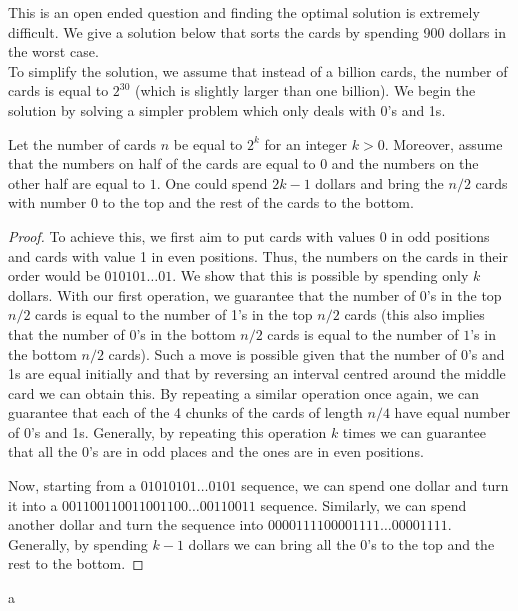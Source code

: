 \begin{solution}
This is an open ended question and finding the optimal solution is extremely difficult. We give a solution below that sorts the cards by spending 900 dollars in the worst case.\\[0.2cm]

To simplify the solution, we assume that instead of a billion cards, the number of cards is equal to $2^{30}$ (which is slightly larger than one billion). We begin the solution by solving a simpler problem which only deals with 0's and 1s.
\begin{lemma}\label{lemma:mohem}
	Let the number of cards $n$ be equal to $2^k$ for an integer $k > 0$. Moreover, assume that the numbers on half of the cards are equal to 0 and the numbers on the other half are equal to $1$. One could spend $2k-1$ dollars and bring the $n/2$ cards with number 0 to the top and the rest of the cards to the bottom.
\end{lemma}
\begin{proof}
To achieve this, we first aim to put cards with values 0 in odd positions and cards with value 1 in even positions. Thus, the numbers on the cards in their order would be $010101\ldots01$. We show that this is possible by spending only $k$ dollars. With our first operation, we guarantee that the number of 0's in the top $n/2$ cards is equal to the number of 1's in the top $n/2$ cards (this also implies that the number of 0's in the bottom $n/2$ cards is equal to the number of $1$'s in the bottom $n/2$ cards). Such a move is possible given that the number of 0's and 1s are equal initially and that by reversing an interval centred around the middle card we can obtain this. By repeating a similar operation once again, we can guarantee that each of the 4 chunks of the cards of length $n/4$ have equal number of 0's and 1s. Generally, by repeating this operation $k$ times we can guarantee that all the 0's are in odd places and the ones are in even positions.

Now, starting from a $01010101\ldots0101$ sequence, we can spend one dollar and turn it into a $001100110011001100\ldots00110011$ sequence. Similarly, we can spend another dollar and turn the sequence into $0000111100001111\ldots00001111$. Generally, by spending $k-1$ dollars we can bring all the 0's to the top and the rest to the bottom.
\end{proof}a


\end{solution}
